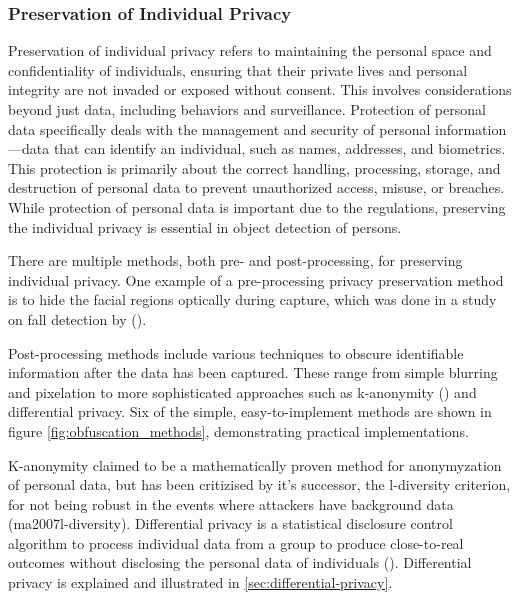 \subsubsection{Preservation of Individual Privacy}

Preservation of individual privacy refers to maintaining the personal space and confidentiality of individuals, ensuring that their private lives and personal integrity are not invaded or exposed without consent. This involves considerations beyond just data, including behaviors and surveillance. Protection of personal data specifically deals with the management and security of personal information—data that can identify an individual, such as names, addresses, and biometrics. This protection is primarily about the correct handling, processing, storage, and destruction of personal data to prevent unauthorized access, misuse, or breaches. While protection of personal data is important due to the regulations, preserving the individual privacy is essential in object detection of persons.

There are multiple methods, both pre- and post-processing, for preserving individual privacy. One example of a pre-processing privacy preservation method is to hide the facial regions optically during capture, which was done in a study on fall detection by \citeauthor{wa2020elderly_fall_detection_meta} (\citeauthor{wa2020elderly_fall_detection_meta}).

Post-processing methods include various techniques to obscure identifiable information after the data has been captured. These range from simple blurring and pixelation to more sophisticated approaches such as k-anonymity (\cite{sw2002kAnonymity}) and differential privacy. Six of the simple, easy-to-implement methods are shown in figure \ref{fig:obfuscation_methods}, demonstrating practical implementations.

K-anonymity claimed to be a mathematically proven method for anonymyzation of personal data, but has been critizised by it's successor, the l-diversity criterion, for not being robust in the events where attackers have background data (ma2007l-diversity). Differential privacy is a statistical disclosure control algorithm to process individual data from a group to produce close-to-real outcomes without disclosing the personal data of individuals (\cite{hu2023metaverse-privacy}). Differential privacy is explained and illustrated in \ref{sec:differential-privacy}.

